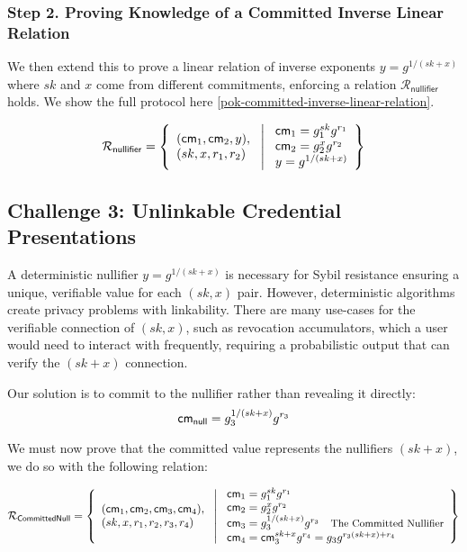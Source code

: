 \subsubsection*{Step 2. Proving Knowledge of a Committed Inverse Linear Relation}

We then extend this to prove a linear relation of inverse exponents $y = g^{1/(sk+x)}$ where $sk$ and $x$ come from different commitments, enforcing a relation $\mathcal{R}_{\mathsf{nullifier}}$ holds. We show the full protocol here \ref{pok-committed-inverse-linear-relation}. 

\[
\mathcal{R}_{\mathsf{nullifier}} = \left\{ 
\begin{array}{l} (\mathsf{cm}_1, \mathsf{cm}_2, y),\\
(sk, x, r_1, r_2) 
\end{array}
\ \middle|
\ \begin{array}{l}
\mathsf{cm}_1 = g_1^{sk} g^{r_1} \\
\mathsf{cm}_2 = g_2^{x} g^{r_2} \\
y = g^{1/(sk + x)} \\
\end{array} \right\}
\]


\subsection{Challenge 3: Unlinkable Credential Presentations}

A deterministic nullifier $y = g^{1/(sk+x)}$ is necessary for Sybil resistance ensuring a unique, verifiable value for each $(sk,x)$ pair. However, deterministic algorithms create privacy problems with linkability. There are many use-cases for the verifiable connection of $(sk, x)$, such as revocation accumulators, which a user would need to interact with frequently, requiring a probabilistic output that can verify the $(sk+x)$ connection. 

Our solution is to commit to the nullifier rather than revealing it directly:
\[
\mathsf{cm}_{\mathsf{null}} = g_3^{1/(sk+x)} g^{r_3}
\]

We must now prove that the committed value represents the nullifiers $(sk+x)$, we do so with the following relation:


\[
\mathcal{R}_{\mathsf{CommittedNull}} = \left\{ 
\begin{array}{l} 
(\mathsf{cm}_1, \mathsf{cm}_2, \mathsf{cm}_3, \mathsf{cm}_4), \\
(sk, x, r_1, r_2, r_3, r_4) 
\end{array}
\ \middle| \
\begin{array}{l}
\mathsf{cm}_1 = g_1^{sk} g^{r_1} \\
\mathsf{cm}_2 = g_2^{x} g^{r_2} \\
\mathsf{cm}_3 = g_3^{1/(sk + x)} g^{r_3}  \quad \text{\small{The Committed Nullifier}}\\
\mathsf{cm}_4 = \mathsf{cm}_3^{sk + x} g^{r_4} = g_3 g^{r_3 (sk + x) + r_4}
\end{array} \right\}
\]

